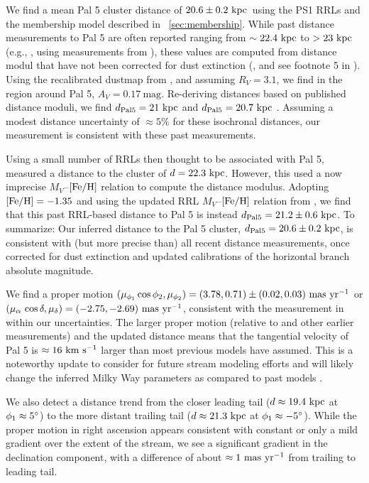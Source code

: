 \documentclass[twocolumn]{aastex63}
\newcommand{\sa}[1]{{\color{teal} SP: #1}}
\newcommand{\clderr}{\ensuremath{20.6 \pm 0.2~\kpc}}
\begin{document}
We find a mean Pal 5 cluster distance of \clderr\ using the PS1 RRLs and the membership model described in \sectionname~\ref{sec:membership}.
While past distance measurements to Pal 5 are often reported ranging from $\sim 22.4~\mathrm{kpc}$ to $>23~\mathrm{kpc}$ (e.g., \citealt{Odenkirchen:2009, Erkal:2017}, using measurements from \citealt{Harris:1996, Dotter:2011}), these values are computed from distance modul that have not been corrected for dust extinction (\citealt{Harris:1996}, and see footnote 5 in \citealt{Fritz:2015}).
Using the recalibrated \citet{Schlegel:1998} dustmap from \citet{Schlafly:2011}, and assuming $R_V=3.1$, we find in the region around Pal 5, $A_V = 0.17~\textrm{mag}$.
Re-deriving distances based on published distance moduli, we find $d_{\rm Pal 5} = 21~\mathrm{kpc}$ \citep{Harris:1996} and $d_{\rm Pal 5} = 20.7~\mathrm{kpc}$ \citep{Dotter:2011}.
Assuming a modest distance uncertainty of $\approx 5\%$ for these isochronal distances, our measurement is consistent with these past measurements.

Using a small number of RRLs then thought to be associated with Pal 5, \citet{Vivas:2006} measured a distance to the cluster of $d = 22.3~\mathrm{kpc}$.
However, this used a now imprecise $M_V$--${[{\rm Fe}/{\rm H}]}$ relation to compute the distance modulus.
Adopting ${[{\rm Fe}/{\rm H}]} = -1.35$ \citep{Ishigaki:2016} and using the updated RRL $M_V$--${[{\rm Fe}/{\rm H}]}$ relation from \citet{Muraveva:2018}, we find that this past RRL-based distance to Pal 5 is instead $d_{\rm Pal 5} = 21.2 \pm 0.6~\mathrm{kpc}$.
To summarize: Our inferred distance to the Pal 5 cluster, $d_{\rm Pal 5} = \clderr$, is consistent with (but more precise than) all recent distance measurements, once corrected for dust extinction and updated calibrations of the horizontal branch absolute magnitude.

We find a proper motion $(\mu_{\phi_1}\cos\phi_2, \mu_{\phi_2}) = (3.78, 0.71) \pm (0.02, 0.03)~\mathrm{mas}~\mathrm{yr}^{-1}$ or $(\mu_\alpha\,\cos\delta, \mu_\delta) = (-2.75, -2.69)~\mathrm{mas}~\mathrm{yr}^{-1}$, consistent with the measurement in \citet{Vasiliev:2019} within our uncertainties.
The larger proper motion (relative to \citealt{Fritz:2015} and other earlier measurements) and the updated distance means that the tangential velocity of Pal 5 is $\approx 16~\mathrm{km}~\mathrm{s}^{-1}$ larger than most previous models have assumed.
This is a noteworthy update to consider for future stream modeling efforts and will likely change the inferred Milky Way parameters as compared to past models \citep[e.g.,][]{Kuepper:2015, Bovy:2016}.

We also detect a distance trend from the closer leading tail ($d \approx 19.4~\mathrm{kpc}$ at $\phi_1 \approx 5\mbox{$^\circ$}$) to the more distant trailing tail ($d \approx 21.3~\mathrm{kpc}$ at $\phi_1 \approx -5\mbox{$^\circ$}$).
While the proper motion in right ascension appears consistent with constant or only a mild gradient over the extent of the stream, we see a significant gradient in the declination component, with a difference of about $\approx 1~\mathrm{mas}~\mathrm{yr}^{-1}$ from trailing to leading tail.
\end{document}
